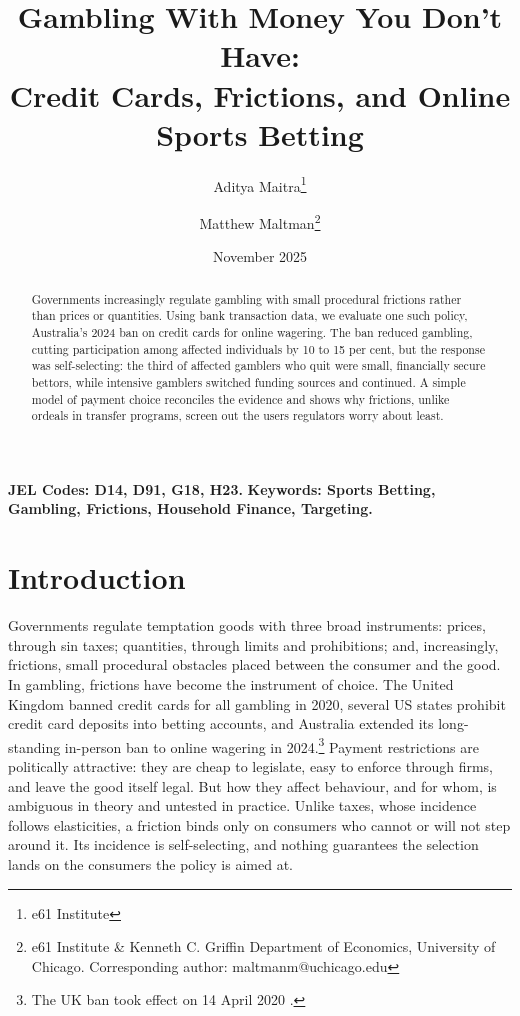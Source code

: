 \documentclass[11pt]{article}
\title{Gambling With Money You Don't Have:\\Credit Cards, Frictions, and Online Sports Betting}
\author{Aditya Maitra\footnote{e61 Institute} \and Matthew Maltman\footnote{e61 Institute \& Kenneth C. Griffin Department of Economics, University of Chicago. Corresponding author: maltmanm@uchicago.edu}}
\date{November 2025}
\begin{document}
\maketitle
\begin{abstract}
\noindent Governments increasingly regulate gambling with small procedural frictions rather than prices or quantities. Using bank transaction data, we evaluate one such policy, Australia's 2024 ban on credit cards for online wagering. The ban reduced gambling, cutting participation among affected individuals by 10 to 15 per cent, but the response was self-selecting: the third of affected gamblers who quit were small, financially secure bettors, while intensive gamblers switched funding sources and continued. A simple model of payment choice reconciles the evidence and shows why frictions, unlike ordeals in transfer programs, screen out the users regulators worry about least.
\end{abstract}

\vspace{0.1in} \noindent
\textbf{JEL Codes: D14, D91, G18, H23.} \quad
\textbf{Keywords: Sports Betting, Gambling, Frictions, Household Finance, Targeting.}

\newpage

\section{Introduction}

Governments regulate temptation goods with three broad instruments: prices, through sin taxes; quantities, through limits and prohibitions; and, increasingly, frictions, small procedural obstacles placed between the consumer and the good. In gambling, frictions have become the instrument of choice. The United Kingdom banned credit cards for all gambling in 2020, several US states prohibit credit card deposits into betting accounts, and Australia extended its long-standing in-person ban to online wagering in 2024.\footnote{The UK ban took effect on 14 April 2020 \citep{GamblingCommission2020_CreditCardBan}. %
} Payment restrictions are politically attractive: they are cheap to legislate, easy to enforce through firms, and leave the good itself legal. But how they affect behaviour, and for whom, is ambiguous in theory and untested in practice. Unlike taxes, whose incidence follows elasticities, a friction binds only on consumers who cannot or will not step around it. Its incidence is self-selecting, and nothing guarantees the selection lands on the consumers the policy is aimed at.
\end{document}
